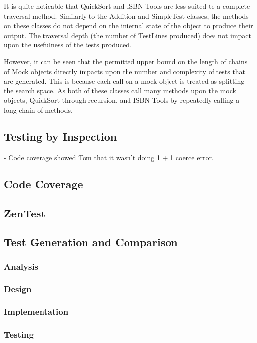   It is quite noticable that QuickSort and ISBN-Tools are less suited to a complete traversal method.
Similarly to the Addition and SimpleTest classes, the methods on these classes do not depend on the internal state of the object to produce their output.
The traversal depth (the number of TestLines produced) does not impact upon the usefulness of the tests produced.

  However, it can be seen that the permitted upper bound on the length of chains of Mock objects directly impacts upon the number and complexity of tests that are generated.
This is because each call on a mock object is treated as splitting the search space.
As both of these classes call many methods upon the mock objects, QuickSort through recursion, and ISBN-Tools by repeatedly calling a long chain of methods.

  \subsection{Testing by Inspection}
  - Code coverage showed Tom that it wasn't doing 1 + 1 coerce error.
  \subsection{Code Coverage}
  \subsection{ZenTest}
  \subsection{Test Generation and Comparison}
    \subsubsection{Analysis}
    \subsubsection{Design}
    \subsubsection{Implementation}
    \subsubsection{Testing}

